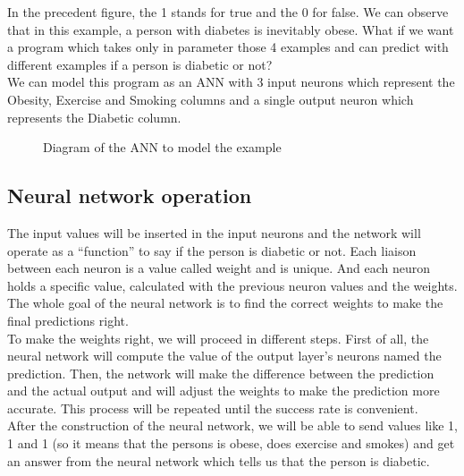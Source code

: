 \documentclass[]{report}
\begin{document}
{In the precedent figure, the 1 stands for true and the 0 for false. We can observe that in this example, a person with diabetes is inevitably obese. What if we want a program which takes only in parameter those 4 examples and can predict with different examples if a person is diabetic or not?}\\

{We can model this program as an ANN with 3 input neurons which represent the Obesity, Exercise and Smoking columns and a single output neuron which represents
the Diabetic column.}

\begin{figure}[H]
    \centering
    \begin{neuralnetwork}[height=3, nodespacing=15mm]
        \outputlayer[count=1, title=Output layer]
        \linklayers
    \end{neuralnetwork}
    \caption{Diagram of the ANN to model the example}
\end{figure}

\subsection{Neural network operation}
\label{subsec:operation}

{The input values will be inserted in the input neurons and the network will operate as a “function” to say if the person is diabetic or not. Each liaison between each neuron is a value called weight and
is unique. And each neuron holds a specific value, calculated with the previous neuron values and the
weights. The whole goal of the neural network is to find the correct weights to make the final predictions
right.}\\

{To make the weights right, we will proceed in different steps. First of all, the neural network will
compute the value of the output layer’s neurons named the prediction. Then, the network will make
the difference between the prediction and the actual output and will adjust the weights to make the
prediction more accurate. This process will be repeated until the success rate is convenient.}\\

{After the construction of the neural network, we will be able to send values like 1, 1 and 1 (so it means that the persons is obese, does exercise and smokes) and get an answer from the neural network which tells us that the person is diabetic.}
\end{document}
